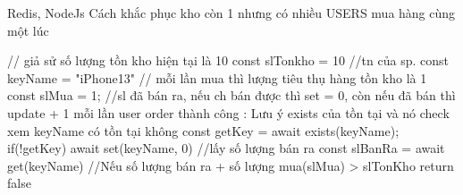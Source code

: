 Redis, NodeJs Cách khắc phục kho còn 1 nhưng có nhiều USERS mua hàng cùng một lúc

// giả sử số lượng tồn kho hiện tại là 10
const slTonkho = 10
//tn của sp.
const keyName = "iPhone13"
// mỗi lần mua thì lượng tiêu thụ hàng tồn kho là 1
const slMua = 1;
//sl đã bán ra, nếu ch bán được thì set = 0, còn nếu đã bán thì update + 1 mỗi lần user order thành công
: Lưu ý exists của tồn tại và nó check xem keyName có tồn tại không
const getKey = await exists(keyName);
if(!getKey) {
await set(keyName, 0)
}
//lấy số lượng bán ra
const slBanRa = await get(keyName)
//Nếu số lượng bán ra + số lượng mua(slMua) > slTonKho return false
